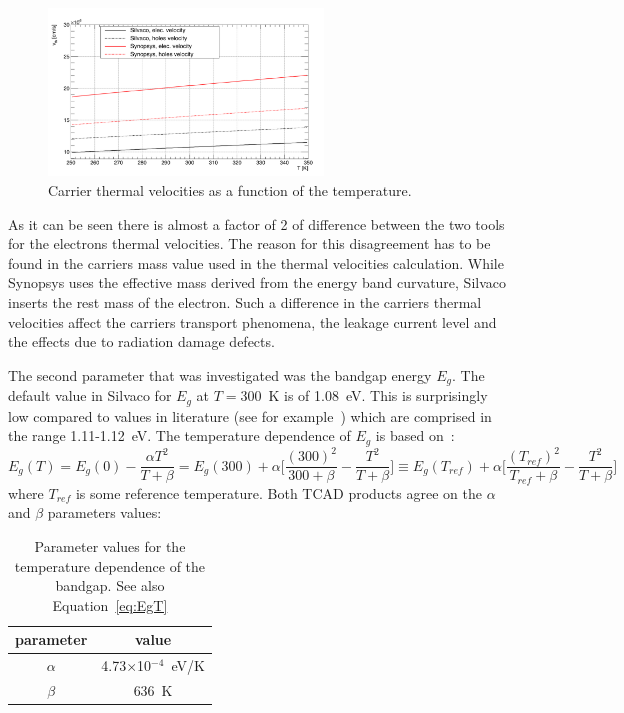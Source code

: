 \begin{figure}[!htbp]
\centering
\includegraphics[width=0.65\textwidth]{vtherm}
\caption{\label{fig:vtherm}Carrier thermal velocities as a function of the temperature.}
\end{figure}
As it can be seen there is almost a factor of 2 of difference between the two tools for the electrons 
thermal velocities. The reason for this disagreement has to be found in the carriers  mass value
used in the thermal velocities calculation. While Synopsys uses the effective  mass derived 
from the energy band curvature, Silvaco inserts the rest mass of the electron. 
Such a difference in the  carriers thermal velocities affect the carriers transport phenomena, 
the leakage current level and the effects due to radiation damage defects. 
 
 The second parameter that was investigated was the bandgap energy $E_g$. The default value in 
 Silvaco for $E_g$ at $T=$300~K is of 1.08~eV. This is surprisingly low compared to values in literature 
 (see for example~\cite{Lutz:411172,Sze1981,Wang1989,Shockley}) which are comprised 
 in the range 1.11-1.12~eV.
The temperature dependence of $E_g$ is based on~\cite{Sze1981}:
\begin{equation}
E_g(T)=E_g(0) -\dfrac{\alpha T^2}{T+\beta}=E_g(300)+\alpha\Bigg[ \dfrac{(300)^2}{300+\beta}-\dfrac{T^2}{T+\beta}  \Bigg] \equiv E_g(T_{ref})+\alpha\Bigg[ \dfrac{(T_{ref})^2}{T_{ref}+\beta}-\dfrac{T^2}{T+\beta}  \Bigg] 
\label{eq:EgT}
\end{equation}
where $T_{ref}$ is some reference temperature.
Both TCAD products agree on the $\alpha$ and $\beta$ parameters values:

\begin{table}[!htbp]
\caption{\label{eq:Egalphabeta}Parameter values for the temperature dependence of the bandgap. 
See also Equation~\ref{eq:EgT}}
\centering
\begin{tabular}{|c|c|}
\hline
parameter & value \\
\hline 
$\alpha$ & 4.73$\times$10$^{-4}$~eV/K \\
\hline 
$\beta$ & 636~K \\
\hline
\end{tabular}
\end{table}

